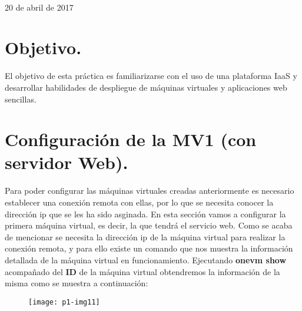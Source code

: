 \documentclass[10pt]{article}
\begin{document}
\begin{center}
 		\\																		%
\vspace{2cm} 																				
\begin{center}																					
{\large 20 de abril de 2017}																	%
 			\end{center}												  						
\end{center}							 											
																					
\newpage																		

\tableofcontents 

\newpage

\section{Objetivo.}
El objetivo de esta práctica es familiarizarse con el uso de una plataforma IaaS y desarrollar habilidades de despliegue de máquinas virtuales y aplicaciones web sencillas.\\


\section{Configuración de la MV1 (con servidor Web).} 
Para poder configurar las máquinas virtuales creadas anteriormente es necesario establecer una conexión remota con ellas, por lo que se necesita conocer la dirección ip que se les ha sido asginada. En esta sección vamos a configurar la primera máquina virtual, es decir, la que tendrá el servicio web. Como se acaba de mencionar se necesita la dirección ip de la máquina virtual para realizar la conexión remota, y para ello existe un comando que nos muestra la información detallada de la máquina virtual en funcionamiento. Ejecutando \textbf{onevm show} acompañado del \textbf{ID} de la máquina virtual obtendremos la información de la misma como se muestra a continuación: \\

\begin{figure}[H]
	\begin{center}
 		\texttt{[image: p1-img11]}
	\end{center} 
\end{figure}
\end{document}
